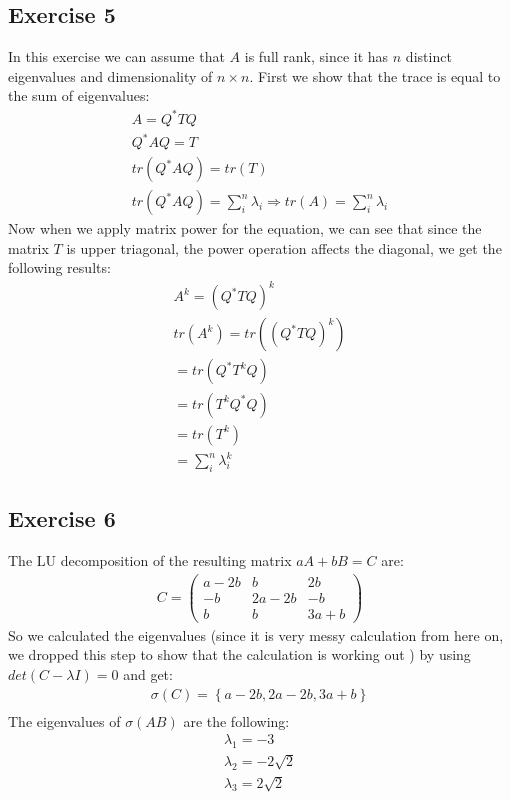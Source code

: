 \subsection{Exercise 5}
In this exercise we can assume that $A$ is full rank, since it has $n$ distinct eigenvalues and dimensionality of $n \times n$. First we show that the trace is equal to the sum of eigenvalues:
\begin{gather*}
A = Q^* T Q\\
Q^* A Q = T \\
tr(Q^* A Q) = tr (T) \\
tr(Q^* A Q) = \sum\limits_i^n \lambda_i \Rightarrow tr(A) = \sum\limits_i^n \lambda_i
\end{gather*}
Now when we apply matrix power for the equation, we can see that since the matrix $T$ is upper triagonal, the power operation affects the diagonal, we get the following results:
\begin{gather*}
A^k = \left( Q^* T Q \right)^k\\
tr(A^k) = tr\left( \left( Q^* T Q \right)^k \right) \\
= tr \left( Q^* T^k Q \right) \\
= tr \left( T^k Q^* Q \right) \\
= tr \left( T^k  \right)\\
= \sum\limits_i^n \lambda_i^k
\end{gather*}


\subsection{Exercise 6}
The LU decomposition of the resulting matrix $aA + bB = C$ are:
\begin{gather*}
C = \left( \begin{array}{ccc}
a-2b & b & 2b\\
-b & 2a-2b &-b \\
b & b & 3a+b
\end{array} \right) 
\end{gather*}
So we calculated the eigenvalues (since it is very messy calculation from here on, we dropped this step to show that the calculation is working out ) by using $ det( C - \lambda I ) = 0$ and get:
\begin{gather*}
\sigma(C) = \left\lbrace a-2b, 2a-2b , 3a+b \right\rbrace \\
\end{gather*}
The eigenvalues of $\sigma(AB)$ are the following:
\begin{gather*}
\lambda_1 = -3\\
\lambda_2 = -2\sqrt{2}\\
\lambda_3 = 2 \sqrt{2}
\end{gather*}

